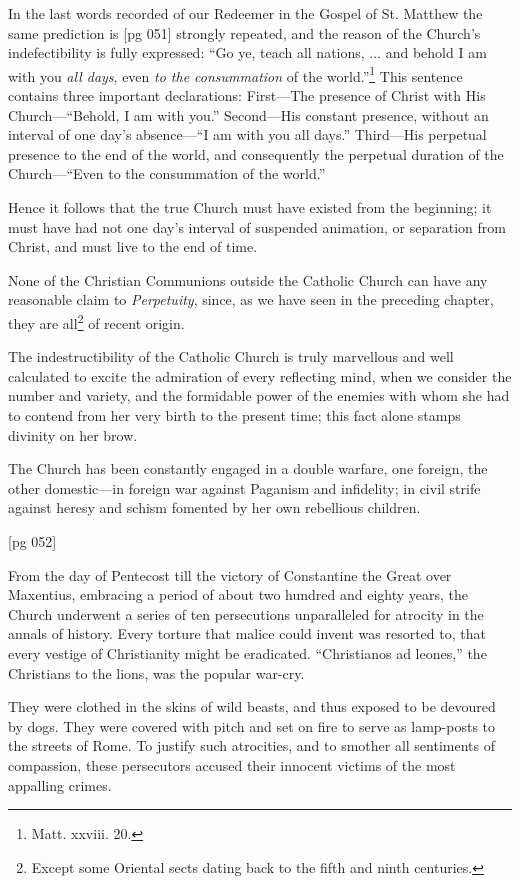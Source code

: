 In the last words recorded of our Redeemer in
the Gospel of St. Matthew the same prediction is
[pg 051]
strongly repeated, and the reason of the Church's
indefectibility is fully expressed: “Go ye, teach
all nations, ... and behold I am with you \emph{all
days}, even \emph{to the consummation} of the
world.”\footnote{Matt. xxviii. 20.}
This sentence contains three important declarations:
First—The presence of Christ with His
Church—“Behold, I am with you.” Second—His
constant presence, without an interval of one
day's absence—“I am with you all days.” Third—His
perpetual presence to the end of the world,
and consequently the perpetual duration of the
Church—“Even to the consummation of the
world.”

Hence it follows that the true Church must
have existed from the beginning; it must have
had not one day's interval of suspended animation,
or separation from Christ, and must live
to the end of time.

None of the Christian Communions outside the
Catholic Church can have any reasonable claim
to \emph{Perpetuity}, since, as we have seen in the preceding
chapter, they are all\footnote{Except some
Oriental sects dating back to the fifth and
ninth centuries.} of recent origin.

The indestructibility of the Catholic Church is
truly marvellous and well calculated to excite the
admiration of every reflecting mind, when we consider
the number and variety, and the formidable
power of the enemies with whom she had to contend
from her very birth to the present time; this
fact alone stamps divinity on her brow.

The Church has been constantly engaged in a
double warfare, one foreign, the other domestic—in
foreign war against Paganism and infidelity;
in civil strife against heresy and schism fomented
by her own rebellious children.

[pg 052]

From the day of Pentecost till the victory of
Constantine the Great over Maxentius, embracing
a period of about two hundred and eighty years,
the Church underwent a series of ten persecutions
unparalleled for atrocity in the annals of
history. Every torture that malice could invent
was resorted to, that every vestige of Christianity
might be eradicated. “Christianos ad leones,”
the Christians to the lions, was the popular war-cry.

They were clothed in the skins of wild beasts,
and thus exposed to be devoured by dogs. They
were covered with pitch and set on fire to serve
as lamp-posts to the streets of Rome. To justify
such atrocities, and to smother all sentiments of
compassion, these persecutors accused their innocent
victims of the most appalling crimes.

